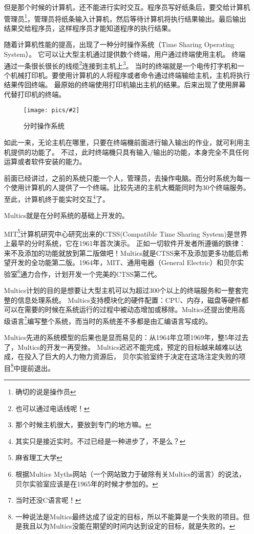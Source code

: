 \documentclass[amstex]{ctexbook}
\newenvironment{insertnote}{ \ttfamily\CJKfamily{KaiTi} }{\vskip 1cm }
\newcommand{\chatu}[3][0.35]{%
\begin{figure}[h]%
\centering%
\texttt{[image: pics/\#2]}%
\caption{#3\label{fig:#2}}%
\end{figure}%
}
\begin{document}
\begin{insertnote}
但是那个时候的计算机，还不能进行实时交互。程序员写好纸条后，要交给计算机管理员\footnote{确切的说是操作员}，管理员将纸条输入计算机，然后等待计算机将执行结果输出。最后输出结果交给程序员，这样程序员才能知道程序的执行结果。


随着计算机性能的提高，出现了一种分时操作系统（Time Sharing Operating System）。 
它可以让大型主机通过提供数个终端，用户通过终端使用主机。
终端通过一条很长很长的线缆\footnote{也可以通过电话线呢！}连接到主机上\footnote{那个时候主机很大，要放到专门的地方嘛。}。
当时的终端就是一个电传打字机和一个机械打印机。要使用计算机的人将程序或者命令通过终端输给主机，主机将执行结果传回终端。
最原始的终端使用打印机输出主机的结果。后来出现了使用屏幕代替打印机的终端。

\chatu[0.8]{ctss}{分时操作系统}

如此一来，无论主机在哪里，只要在终端機前面进行输入输出的作业，就可利用主机提供的功能了。 不过，此时终端機只具有输入/输出的功能，本身完全不具任何运算或者软件安装的能力。 

前面已经讲过，之前的系统只能一个人，管理员，去操作电脑。而分时系统为每一个使用计算机的人提供了一个终端。比较先进的主机大概能同时为30个终端服务。 至此，计算机终于能实时交互\footnote{其实只是接近实时。不过已经是一种进步了，不是么？}了。

Multics就是在分时系统的基础上开发的。

\end{insertnote}

MIT\footnote{麻省理工大学}计算机研究中心研究出来的CTSS(Compatible Time Sharing System)是世界上最早的分时系统，它在1961年首次演示。
正如一切软件开发者所遵循的鉄律：来不及添加的功能就放到第二版做吧！Multics就是CTSS来不及添加更多功能后希望开发的全功能第二版。1964年，MIT、通用电器（General Electric）和贝尔实验室\footnote{根据Multics Myths网站（一个网站致力于破除有关Multics的谣言）的说法，贝尔实验室应该是在1965年的时候才参加的。
}通力合作，计划开发一个完美的CTSS第二代。

Multics计划的目的是想要让大型主机可以\textbf{}为超过300个以上的终端服务和一整套完整的信息处理系统。
Multics支持模块化的硬件配置：CPU、内存，磁盘等硬件都可以在需要的时候在系统运行的过程中被动态增加或移除。Multics还提出使用高级语言\footnote{当时还没C语言呢！}编写整个系统，而当时的系统差不多都是由汇编语言写成的。

Multics先进的系统模型的后果也是显而易见的：从1964年立项1969年，整5年过去了，Multics的开发一再受挫。
Multics迟迟不能完成，预定的目标越来越难以达成，在投入了巨大的人力物力资源后，
贝尔实验室终于决定在这场注定失败的项目\footnote{一种说法是Multics最终达成了设定的目标，所以不能算是一个失败的项目。但是我且以为Multics没能在期望的时间内达到设定的目标，就是失败的。}中提前退出。
\end{document}
